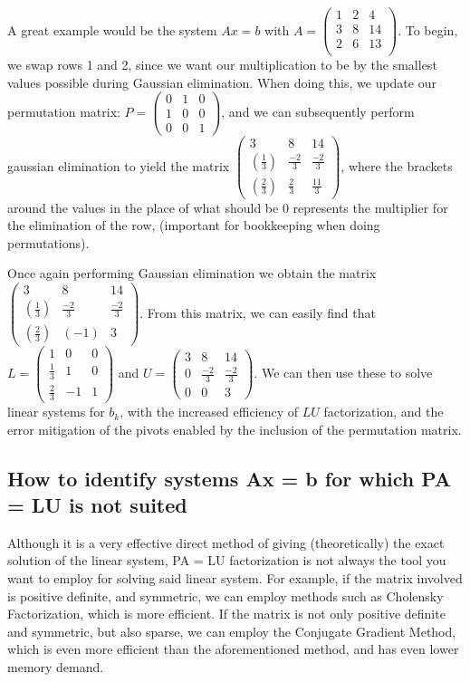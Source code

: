 \documentclass[11pt]{article}
\begin{document}
A great example would be the system $Ax = b$  with $A = \begin{pmatrix}1 & 2 & 4\\3 & 8 & 14\\ 2 & 6 & 13\\
\end{pmatrix}$.
To begin, we swap rows 1 and 2, since we want our multiplication to be by the smallest values possible during Gaussian elimination.
When doing this, we update our permutation matrix: $P = \begin{pmatrix}0&1&0\\1&0&0\\0&0&1
\end{pmatrix}$, and we can subsequently perform gaussian elimination to yield the matrix $\begin{pmatrix}3&8&14\\(\frac{1}{3})&\frac{-2}{3}&\frac{-2}{3}\\(\frac{2}{3})&\frac{2}{3}&\frac{11}{3}
\end{pmatrix}$, where the brackets around the values in the place of what should be $0$ represents the multiplier for the elimination of the row, (important for bookkeeping when doing permutations).

Once again performing Gaussian elimination we obtain the matrix $\begin{pmatrix}3&8&14\\(\frac{1}{3})&\frac{-2}{3}&\frac{-2}{3}\\(\frac{2}{3})&(-1)&3
\end{pmatrix}$.
From this matrix, we can easily find that $L = \begin{pmatrix}1&0&0\\\frac{1}{3}&1&0\\\frac{2}{3}&-1&1
\end{pmatrix}$ and $U = \begin{pmatrix}3&8&14\\0&\frac{-2}{3}&\frac{-2}{3}\\0&0&3
\end{pmatrix}$.
We can then use these to solve linear systems for $b_k$, with the increased efficiency of $LU$ factorization, and the error mitigation of the pivots enabled by the inclusion of the permutation matrix.\\


\subsection{How to identify systems Ax = b for which PA = LU is not suited}
Although it is a very effective direct method of giving (theoretically) the exact solution of the linear system, PA = LU factorization is not always the tool you want to employ for solving said linear system.
For example, if the matrix involved is positive definite, and symmetric, we can employ methods such as Cholensky Factorization, which is more efficient.
If the matrix is not only positive definite and symmetric, but also sparse, we can employ the Conjugate Gradient Method, which is even more efficient than the aforementioned method, and has even lower memory demand.
\end{document}
